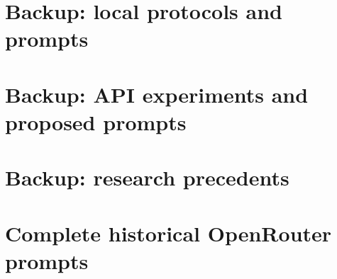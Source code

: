 \documentclass[aspectratio=169,11pt]{beamer}
\newcommand{\sectiontag}{A\quad NF4 greedy decoding}
\begin{document}
\section{Backup: local protocols and prompts}
\renewcommand{\sectiontag}{Backup\quad Python protocol}

\renewcommand{\sectiontag}{Backup\quad Cluster prompts}


\section{Backup: API experiments and proposed prompts}
\renewcommand{\sectiontag}{Backup\quad Earlier API experiments}

\renewcommand{\sectiontag}{Backup\quad Proposed prompts}

\section{Backup: research precedents}
\renewcommand{\sectiontag}{Backup\quad Research precedents}


\section{Complete historical OpenRouter prompts}
\renewcommand{\sectiontag}{Backup\quad OpenRouter prompt archive}

\end{document}
